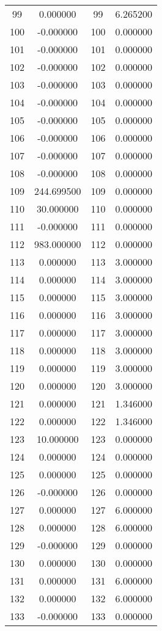 \documentclass[12pt]{article}
\begin{document}
\begin{longtable}{@{}cccc@{}}
99 & 0.000000 & 99 & 6.265200 \\
100 & -0.000000 & 100 & 0.000000 \\
101 & -0.000000 & 101 & 0.000000 \\
102 & -0.000000 & 102 & 0.000000 \\
103 & -0.000000 & 103 & 0.000000 \\
104 & -0.000000 & 104 & 0.000000 \\
105 & -0.000000 & 105 & 0.000000 \\
106 & -0.000000 & 106 & 0.000000 \\
107 & -0.000000 & 107 & 0.000000 \\
108 & -0.000000 & 108 & 0.000000 \\
109 & 244.699500 & 109 & 0.000000 \\
110 & 30.000000 & 110 & 0.000000 \\
111 & -0.000000 & 111 & 0.000000 \\
112 & 983.000000 & 112 & 0.000000 \\
113 & 0.000000 & 113 & 3.000000 \\
114 & 0.000000 & 114 & 3.000000 \\
115 & 0.000000 & 115 & 3.000000 \\
116 & 0.000000 & 116 & 3.000000 \\
117 & 0.000000 & 117 & 3.000000 \\
118 & 0.000000 & 118 & 3.000000 \\
119 & 0.000000 & 119 & 3.000000 \\
120 & 0.000000 & 120 & 3.000000 \\
121 & 0.000000 & 121 & 1.346000 \\
122 & 0.000000 & 122 & 1.346000 \\
123 & 10.000000 & 123 & 0.000000 \\
124 & 0.000000 & 124 & 0.000000 \\
125 & 0.000000 & 125 & 0.000000 \\
126 & -0.000000 & 126 & 0.000000 \\
127 & 0.000000 & 127 & 6.000000 \\
128 & 0.000000 & 128 & 6.000000 \\
129 & -0.000000 & 129 & 0.000000 \\
130 & 0.000000 & 130 & 0.000000 \\
131 & 0.000000 & 131 & 6.000000 \\
132 & 0.000000 & 132 & 6.000000 \\
133 & -0.000000 & 133 & 0.000000 \\

\end{longtable}
\end{document}
